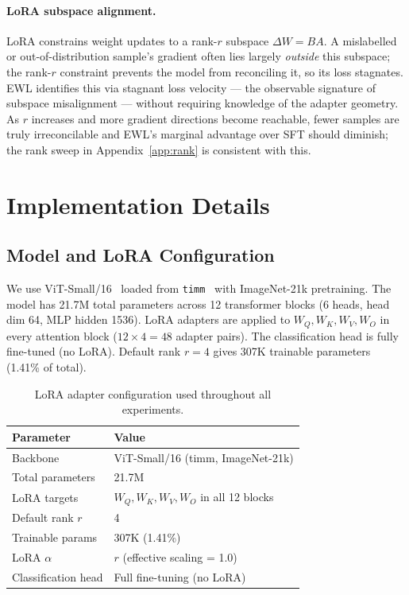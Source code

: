 \paragraph{LoRA subspace alignment.}
LoRA constrains weight updates to a rank-$r$ subspace $\Delta W = BA$.
A mislabelled or out-of-distribution sample's gradient often lies largely
\emph{outside} this subspace; the rank-$r$ constraint prevents the model from
reconciling it, so its loss stagnates.
EWL identifies this via stagnant loss velocity --- the observable signature of
subspace misalignment --- without requiring knowledge of the adapter geometry.
As $r$ increases and more gradient directions become reachable, fewer samples
are truly irreconcilable and EWL's marginal advantage over SFT should diminish;
the rank sweep in Appendix~\ref{app:rank} is consistent with this.

\section{Implementation Details}
\label{app:implementation}

\subsection{Model and LoRA Configuration}

We use ViT-Small/16~\cite{dosovitskiy2021vit} loaded from
\texttt{timm}~\cite{rw2019timm} with ImageNet-21k pretraining.
The model has 21.7M total parameters across 12 transformer blocks
(6 heads, head dim 64, MLP hidden 1536).
LoRA adapters are applied to $W_Q,W_K,W_V,W_O$ in every attention block
($12\times 4 = 48$ adapter pairs).
The classification head is fully fine-tuned (no LoRA).
Default rank $r{=}4$ gives 307K trainable parameters (1.41\% of total).

\begin{table}[h]
  \centering
  \caption{LoRA adapter configuration used throughout all experiments.}
  \label{tab:lora_config}
  \begin{tabular}{ll}
    \toprule
    \textbf{Parameter} & \textbf{Value} \\
    \midrule
    Backbone            & ViT-Small/16 (timm, ImageNet-21k) \\
    Total parameters    & 21.7M \\
    LoRA targets        & $W_Q, W_K, W_V, W_O$ in all 12 blocks \\
    Default rank $r$    & 4 \\
    Trainable params    & 307K (1.41\%) \\
    LoRA $\alpha$       & $r$ (effective scaling = 1.0) \\
    Classification head & Full fine-tuning (no LoRA) \\
    \bottomrule
  \end{tabular}
\end{table}

